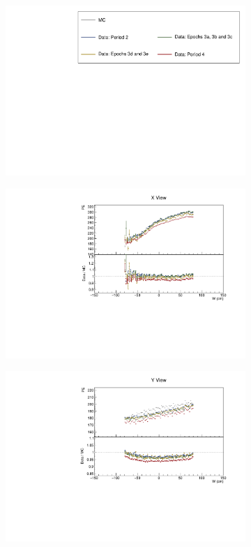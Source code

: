 \documentclass[12pt,a4paper]{article}
\begin{document}
\begin{figure}[h!]
  \begin{subfigure}{\textwidth}
  \centering
    \includegraphics[height=0.2\linewidth]{essentialsec_tb/legend.pdf}
  \end{subfigure}
  \vspace*{2mm}

  \begin{subfigure}{0.5\textwidth}
    \includegraphics[width=\linewidth]{essentialsec_tb/pe_w_x.pdf}
  \end{subfigure}
  \begin{subfigure}{0.5\textwidth}
    \includegraphics[width=\linewidth]{essentialsec_tb/pe_w_y.pdf}

\end{subfigure}
\end{figure}
\end{document}

